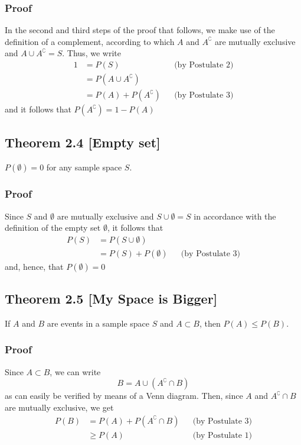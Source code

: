 \documentclass{article}
\begin{document}
\subsubsection*{Proof}

In the second and third steps of the proof that follows, we make use of the definition of a complement, according to which \(A\) and \(A^\complement\) are mutually exclusive and \(A \cup A^\complement = S \). Thus, we write
\begin{align*}
1 &= P(S) && \text{(by Postulate 2)} \\
&=P(A \cup A^\complement)\\
&=P(A) + P(A^\complement) && \text{(by Postulate 3)}
\end{align*}
and it follows that \(P(A^\complement) = 1 - P(A)\)

\subsection*{Theorem 2.4 [Empty set]}
\(P(\emptyset)=0 \) for any sample space \(S\).

\subsubsection*{Proof}
Since \(S\) and \(\emptyset\) are mutually exclusive and \(S \cup \emptyset = S\) in accordance with the definition of the empty set \(\emptyset\), it follows that
\begin{align*}
P(S) &= P(S \cup \emptyset)\\
&=P(S) + P(\emptyset) && \text{(by Postulate 3)}
\end{align*}
and, hence, that \(P(\emptyset)=0\)

\subsection*{Theorem 2.5 [My Space is Bigger]}
If \(A\) and \(B\) are events in a sample space \(S\) and \(A \subset B\), then \(P(A) \le P(B)\).

\subsubsection*{Proof}
Since \(A \subset B\), we can write
\[ B = A \cup (A^\complement \cap B) \]
as can easily be verified by means of a Venn diagram. Then, since \(A\) and \(A^\complement \cap B\) are mutually exclusive, we get
\begin{align*}
P(B) &= P(A) + P(A^\complement \cap B) && \text{(by Postulate 3)}\\
& \ge P(A) && \text{(by Postulate 1)}
\end{align*}
\end{document}

